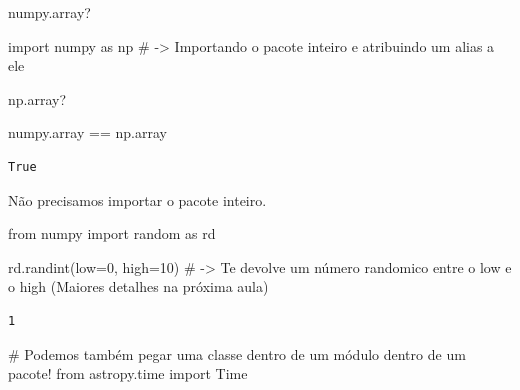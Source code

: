 \documentclass[
  letterpaper,
  DIV=11,
  numbers=noendperiod]{scrreprt}
\newenvironment{Shaded}{\begin{snugshade}}{\end{snugshade}}
\newcommand{\CommentTok}[1]{\textcolor[rgb]{0.37,0.37,0.37}{#1}}
\newcommand{\DecValTok}[1]{\textcolor[rgb]{0.68,0.00,0.00}{#1}}
\newcommand{\ImportTok}[1]{\textcolor[rgb]{0.00,0.46,0.62}{#1}}
\newcommand{\NormalTok}[1]{\textcolor[rgb]{0.00,0.23,0.31}{#1}}
\newcommand{\OperatorTok}[1]{\textcolor[rgb]{0.37,0.37,0.37}{#1}}
\begin{document}
\begin{Shaded}
\begin{Highlighting}[]
\NormalTok{numpy.array?}
\end{Highlighting}
\end{Shaded}

\begin{Shaded}
\begin{Highlighting}[]
\ImportTok{import}\NormalTok{ numpy }\ImportTok{as}\NormalTok{ np }\CommentTok{\# {-}\textgreater{} Importando o pacote inteiro e atribuindo um alias a ele}

\NormalTok{np.array?}
\end{Highlighting}
\end{Shaded}

\begin{Shaded}
\begin{Highlighting}[]
\NormalTok{numpy.array }\OperatorTok{==}\NormalTok{ np.array}
\end{Highlighting}
\end{Shaded}

\begin{verbatim}
True
\end{verbatim}

Não precisamos importar o pacote inteiro.

\begin{Shaded}
\begin{Highlighting}[]
\ImportTok{from}\NormalTok{ numpy }\ImportTok{import}\NormalTok{ random }\ImportTok{as}\NormalTok{ rd}
\end{Highlighting}
\end{Shaded}

\begin{Shaded}
\begin{Highlighting}[]
\NormalTok{rd.randint(low}\OperatorTok{=}\DecValTok{0}\NormalTok{, high}\OperatorTok{=}\DecValTok{10}\NormalTok{) }\CommentTok{\# {-}\textgreater{} Te devolve um número randomico entre o \textasciigrave{}low\textasciigrave{} e o \textasciigrave{}high\textasciigrave{} (Maiores detalhes na próxima aula)}
\end{Highlighting}
\end{Shaded}

\begin{verbatim}
1
\end{verbatim}

\begin{Shaded}
\begin{Highlighting}[]
\CommentTok{\# Podemos também pegar uma classe dentro de um módulo dentro de um pacote!}
\ImportTok{from}\NormalTok{ astropy.time }\ImportTok{import}\NormalTok{ Time}
\end{Highlighting}
\end{Shaded}
\end{document}

